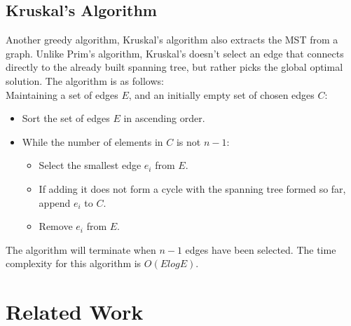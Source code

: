 \subsection{Kruskal's Algorithm}
Another greedy algorithm,  Kruskal's algorithm  also extracts the MST from a graph.  Unlike Prim's algorithm, Kruskal's doesn't select an edge that connects directly to the already built spanning tree, but rather picks the global optimal solution. The algorithm is as follows:\\
Maintaining a set of edges $E$, and an initially empty set of chosen edges $C$:
\begin{itemize}
\item Sort the set of edges $E$ in ascending order.
\item While the number of elements in $C$ is not $n-1$:
	\begin{itemize}
	\item Select the smallest edge $e_i$ from $E$.
	\item If adding it does not form a cycle with the spanning tree formed so far, append $e_i$ to $C$.
	\item Remove $e_i$ from $E$.
	\end{itemize}
\end{itemize}
The algorithm will terminate when $n-1$ edges have been selected.  The time complexity for this algorithm is $O(ElogE)$.





\section{Related Work}

